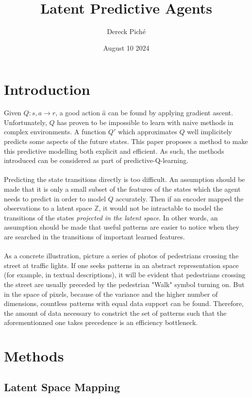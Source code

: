 \documentclass[]{article}
\title{Latent Predictive Agents}
\author{Dereck Piché}
\date{August 10 2024}
\begin{document}
\maketitle



\section{Introduction}


Given $Q : s, a \to r$, a good action $\hat{a}$ can be found by applying gradient ascent.
Unfortunately, $Q$ has proven to be impossible to learn with naive methods in complex environments.
A function $Q'$ which approximates $Q$ well implicitely predicts some aspects of the future states.
This paper proposes a method to make this predictive modelling both explicit and efficient.
As such, the methods introduced can be considered as part of predictive-Q-learning.
\\ \\
Predicting the state transitions directly is too difficult. 
An assumption should be made that it is only a small subset of the features of the states which the agent needs to predict in order to model $Q$ accurately. 
Then if an encoder mapped the observations to a latent space $\mathbb{Z}$, it would not be intractable to model the transitions of the states \textit{projected in the latent space}. 
In other words, an assumption should be made that useful patterns are easier to notice when they are searched in the transitions of important learned features.
\\  \\
As a concrete illustration, picture a series of photos of pedestrians crossing the street at traffic lights. If one seeks patterns in an abstract representation space (for example, in textual descriptions), it will be evident that pedestrians crossing the street are usually preceded by the pedestrian "Walk" symbol turning on. But in the space of pixels, because of the variance and the higher number of dimensions, countless patterns with equal data support can be found. Therefore, the amount of data necessary to constrict the set of patterns such that the aforementionned one takes precedence is an efficiency bottleneck.


\section{Methods}

\subsection{Latent Space Mapping}
\end{document}
